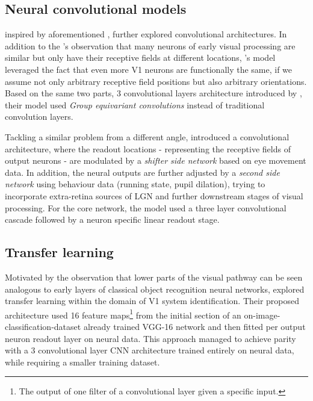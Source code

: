 \subsection{Neural convolutional models}
\cite{ecker} inspired by aforementioned \cite{klindt}, further explored convolutional architectures. In addition to the \citeauthor{klindt}’s observation that many neurons of early visual processing are similar but only have their receptive fields at different locations, \citeauthor{ecker}’s model leveraged the fact that even more V1 neurons are functionally the same, if we assume not only arbitrary receptive field positions but also arbitrary orientations. Based on the same two parts, 3 convolutional layers architecture introduced by \citeauthor{klindt}, their model used \textit{Group equivariant convolutions} \citep{2016arXiv160207576C} instead of traditional convolution layers.

Tackling a similar problem from a different angle, \cite{Walke506956} introduced a convolutional architecture, where the readout locations - representing the receptive fields of output neurons - are modulated by a \textit{shifter side network} based on eye movement data. In addition, the neural outputs are further adjusted by a \textit{second side network} using behaviour data (running state, pupil dilation), trying to incorporate extra-retina sources of LGN and further downstream stages of visual processing. For the core network, the model used a three layer convolutional cascade followed by a neuron specific linear readout stage. 

\subsection{Transfer learning}

Motivated by the observation that lower parts of the visual pathway can be seen analogous to early layers of classical object recognition neural networks, \cite{10.1371/journal.pcbi.1006897} explored transfer learning within the domain of V1 system identification. Their proposed architecture used 16 feature maps\footnote{The output of one filter of a convolutional layer given a specific input.} from the initial section of an on-image-classification-dataset already trained VGG-16 network \citep{VGG16} and then fitted per output neuron readout layer on neural data. This approach managed to achieve parity with a 3 convolutional layer CNN architecture trained entirely on neural data, while requiring a smaller training dataset.

